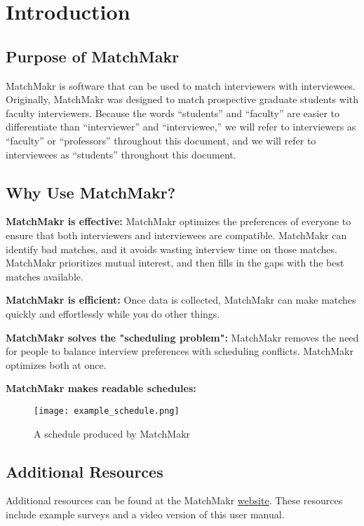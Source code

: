 

\chapter{Introduction}

\section{Purpose of MatchMakr}
MatchMakr is software that can be used to match interviewers with interviewees.  Originally, MatchMakr was designed to match prospective graduate students with faculty interviewers.  Because the words ``students'' and ``faculty'' are easier to differentiate than ``interviewer'' and ``interviewee,'' we will refer to interviewers as ``faculty'' or ``professors'' throughout this document, and we will refer to interviewees as ``students'' throughout this document.

\section{Why Use MatchMakr?}
\par
\textbf{MatchMakr is effective:} 
MatchMakr optimizes the preferences of everyone to ensure that both interviewers and interviewees are compatible.  MatchMakr can identify bad matches, and it avoids wasting interview time on those matches.  MatchMakr prioritizes mutual interest, and then fills in the gaps with the best matches available.

\par
\textbf{MatchMakr is efficient:}
Once data is collected, MatchMakr can make matches quickly and effortlessly while you do other things.

\par
\textbf{MatchMakr solves the "scheduling problem":}
MatchMakr removes the need for people to balance interview preferences with scheduling conflicts.  MatchMakr optimizes both at once.


\textbf{MatchMakr makes readable schedules:}
\begin{figure}[!h]
	\centering
	\texttt{[image: example\_schedule.png]}
	\caption{\label{fig:example_schedule} A schedule produced by MatchMakr}
\end{figure}

\section{Additional Resources}
Additional resources can be found at the MatchMakr \href{https://sites.google.com/case.edu/matchmakr/home}{website}.  These resources include example surveys and a video version of this user manual.